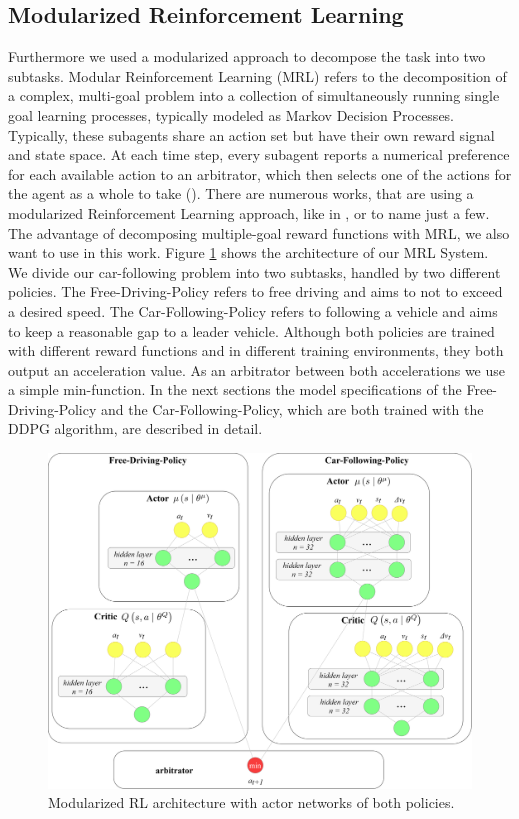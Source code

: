 \documentclass[review]{elsarticle}
\providecommand{\3}{{\ss}}
\begin{document}
  
  \subsection{\label{MRL}Modularized Reinforcement Learning}
  Furthermore we used a modularized approach to decompose the task into two subtasks. Modular Reinforcement Learning (MRL) refers to the decomposition of a complex, multi-goal
  problem into a collection of simultaneously running single goal learning processes, typically modeled as Markov Decision Processes. Typically, these subagents share an action
  set but have their own reward signal and state space. At each
  time step, every subagent reports a numerical preference for
  each available action to an arbitrator, which then selects one
  of the actions for the agent as a whole to take (\cite{MRL}). There are numerous works, that are using a modularized Reinforcement Learning approach, like in \cite{MRLexample1}, \cite{MRLexample2} or \cite{MRLexample3} to name just a few. The advantage of decomposing multiple-goal reward functions with MRL, we also want to use in this work. 
  Figure \ref{fig:MRL} shows the architecture of our MRL System. We divide our car-following problem into two subtasks, handled by two different policies. The Free-Driving-Policy refers to free driving and aims to not to exceed a desired speed. The Car-Following-Policy refers to following a vehicle and aims to keep a reasonable gap to a leader vehicle. Although both policies are trained with different reward functions and in different training environments, they both output an acceleration value. As an arbitrator between both accelerations we use a simple min-function. In the next sections the model specifications of the Free-Driving-Policy and the Car-Following-Policy, which are both trained with the DDPG algorithm, are described in detail.
  
  \begin{figure}
  	\centering
  	\includegraphics[width=12cm]{images/MRL}
  	\caption{Modularized RL architecture with actor networks of both policies.} 
  	\label{fig:MRL}
  \end{figure}
\end{document}
